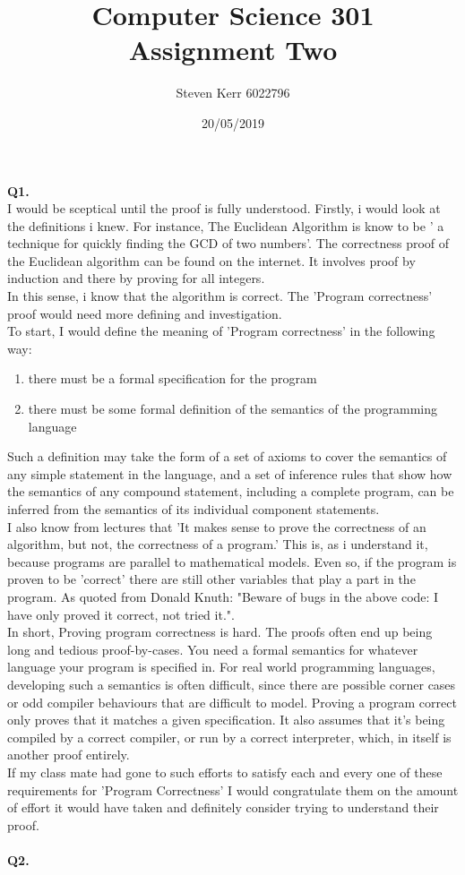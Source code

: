\documentclass[a4paper,12pt]{article}
\title{Computer Science 301 \\
\large Assignment Two}
\author{Steven Kerr 6022796}
\date{20/05/2019}
\begin{document}
\maketitle

\noindent \textbf{Q1.} \\
I would be sceptical until the proof is fully understood. Firstly, i would look at the definitions i knew. For instance, The Euclidean Algorithm is know to be ' a technique for quickly finding the GCD of two numbers'. The correctness proof of the Euclidean algorithm  can be found on the internet. It involves proof by induction and there by proving for all integers. \\ 
In this sense, i know that the algorithm is correct. The 'Program correctness' proof would need more defining and investigation. \\
To start, I would define the meaning of 'Program correctness' in the following way:
\begin{enumerate}
\item there must be a formal specification for the program
\item there must be some formal definition of the semantics of the programming language
\end{enumerate}
Such a definition may take the form of a set of axioms to cover the semantics of any simple statement in the language, and a set of inference rules that show how the semantics of any compound statement, including a complete program, can be inferred from the semantics of its individual component statements. \\
I also know from lectures that 'It makes sense to prove the correctness of an algorithm, but not, the correctness of a program.' This is, as i understand it, because programs are parallel to mathematical models. Even so, if the program is proven to be 'correct' there are still other variables that play a part in the program. As quoted from Donald Knuth: "Beware of bugs in the above code: I have only proved it correct, not tried it.". \\
In short, Proving program correctness is hard. The proofs often end up being long and tedious proof-by-cases. You need a formal semantics for whatever language your program is specified in. For real world programming languages, developing such a semantics is often difficult, since there are possible corner cases or odd compiler behaviours that are difficult to model. Proving a program correct only proves that it matches a given specification. It also assumes that it's being compiled by a correct compiler, or run by a correct interpreter, which, in itself is another proof entirely. \\
If my class mate had gone to such efforts to satisfy each and every one of these requirements for 'Program Correctness' I would congratulate them on the amount of effort it would have taken and definitely consider trying to understand their proof.\\
\\
\noindent \textbf{Q2.} \\
 
\end{document}
